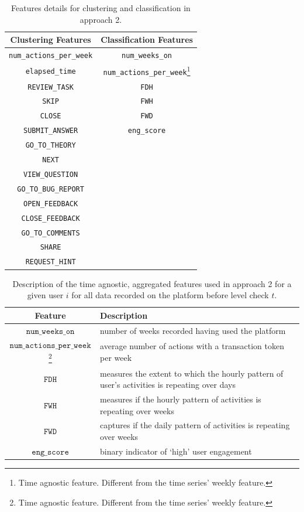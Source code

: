\documentclass[sigplan,screen]{acmart}
\begin{document}
\begin{table}[h]
    \centering
    \caption{Features details for clustering and classification in approach 2.}
    \begin{tabular}{|c|c|}
    \hline
        Clustering Features & Classification Features \\ \hline
        \texttt{num\_actions\_per\_week} & \texttt{num\_weeks\_on}\\ 
        \texttt{elapsed\_time} & \texttt{num\_actions\_per\_week}\footnote{Time agnostic feature. Different from the time series' weekly feature.}\\
        \texttt{REVIEW\_TASK} & \texttt{FDH}\\ 
        \texttt{SKIP} & \texttt{FWH} \\ 
        \texttt{CLOSE} & \texttt{FWD} \\ 
        \texttt{SUBMIT\_ANSWER} & \texttt{eng\_score}\\ 
        \texttt{GO\_TO\_THEORY} & \\ 
        \texttt{NEXT} & \\ 
        \texttt{VIEW\_QUESTION} & \\ 
        \texttt{GO\_TO\_BUG\_REPORT} & \\ 
        \texttt{OPEN\_FEEDBACK} & \\ 
        \texttt{CLOSE\_FEEDBACK} & \\ 
        \texttt{GO\_TO\_COMMENTS} & \\ 
        \texttt{SHARE} & \\ 
        \texttt{REQUEST\_HINT} & \\ \hline
    \end{tabular}
    \label{tab:A2_feature_vectors}
\end{table}


\begin{table}[!ht]
  \caption{Description of the time agnostic, aggregated features used in approach 2 for a given user $i$ for all data recorded on the platform before level check $t$.}
  \label{tab:A2features}
  \begin{tabular}{cl}
    \toprule
    \textbf{Feature}&\textbf{Description}\\
    \midrule
    $\texttt{num\_weeks\_on}$ & number of weeks recorded having used the platform\\
    $\texttt{num\_actions\_per\_week}$\footnote{Time agnostic feature. Different from the time series' weekly feature.} & average number of actions with a transaction token per week\\
    $\texttt{FDH}$ & measures the extent to which the hourly pattern of user’s activities is repeating over days \\
    $\texttt{FWH}$ & measures if the hourly pattern of activities is repeating over weeks\\
    $\texttt{FWD}$ & captures if the daily pattern of activities is repeating over weeks\\
    $\texttt{eng\_score}$ & binary indicator of `high' user engagement\\
    \bottomrule
    \end{tabular}
\end{table}
\end{document}
